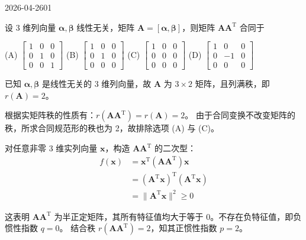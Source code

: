 \begin{mistake}{2026-04-26}{01}

\begin{problemcontent}
设 3 维列向量 \(\boldsymbol{\alpha}, \boldsymbol{\beta}\) 线性无关，矩阵 \(\boldsymbol{A} = [\boldsymbol{\alpha}, \boldsymbol{\beta}]\)，则矩阵 \(\boldsymbol{A}\boldsymbol{A}^{\mathrm{T}}\) 合同于

(A) \(\begin{bmatrix} 1 & 0 & 0 \\ 0 & 1 & 0 \\ 0 & 0 & 1 \end{bmatrix}\) \quad
(B) \(\begin{bmatrix} 1 & 0 & 0 \\ 0 & 1 & 0 \\ 0 & 0 & 0 \end{bmatrix}\) \quad
(C) \(\begin{bmatrix} 1 & 0 & 0 \\ 0 & 0 & 0 \\ 0 & 0 & 0 \end{bmatrix}\) \quad
(D) \(\begin{bmatrix} 1 & 0 & 0 \\ 0 & -1 & 0 \\ 0 & 0 & 0 \end{bmatrix}\)
\end{problemcontent}

\begin{solutioncontent}
已知 \(\boldsymbol{\alpha}, \boldsymbol{\beta}\) 是线性无关的 3 维列向量，故 \(\boldsymbol{A}\) 为 \(3 \times 2\) 矩阵，且列满秩，即 \(r(\boldsymbol{A}) = 2\)。

根据实矩阵秩的性质有：\(r(\boldsymbol{A}\boldsymbol{A}^{\mathrm{T}}) = r(\boldsymbol{A}) = 2\)。
由于合同变换不改变矩阵的秩，所求合同规范形的秩也为 2，故排除选项 (A) 与 (C)。

对任意非零 3 维实列向量 \(\boldsymbol{x}\)，构造 \(\boldsymbol{A}\boldsymbol{A}^{\mathrm{T}}\) 的二次型：
\[
\begin{aligned}
f(\boldsymbol{x}) &= \boldsymbol{x}^{\mathrm{T}}(\boldsymbol{A}\boldsymbol{A}^{\mathrm{T}})\boldsymbol{x} \\
&= (\boldsymbol{A}^{\mathrm{T}}\boldsymbol{x})^{\mathrm{T}}(\boldsymbol{A}^{\mathrm{T}}\boldsymbol{x}) \\
&= \|\boldsymbol{A}^{\mathrm{T}}\boldsymbol{x}\|^2 \ge 0
\end{aligned}
\]

这表明 \(\boldsymbol{A}\boldsymbol{A}^{\mathrm{T}}\) 为半正定矩阵，其所有特征值均大于等于 0。不存在负特征值，即负惯性指数 \(q=0\)。
结合秩 \(r(\boldsymbol{A}\boldsymbol{A}^{\mathrm{T}}) = 2\)，知其正惯性指数 \(p=2\)。


\end{solutioncontent}
\end{mistake}
